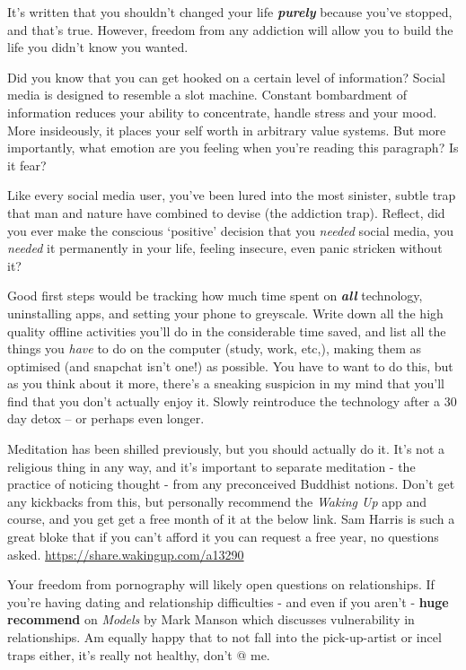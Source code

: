 \documentclass[
]{book}
\begin{document}
It's written that you shouldn't changed your life \textbf{\emph{purely}} because you've stopped, and that's true. However, freedom from any addiction will allow you to build the life you didn't know you wanted.

Did you know that you can get hooked on a certain level of information? Social media is designed to resemble a slot machine. Constant bombardment of information reduces your ability to concentrate, handle stress and your mood. More insideously, it places your self worth in arbitrary value systems. But more importantly, what emotion are you feeling when you're reading this paragraph? Is it fear?

Like every social media user, you've been lured into the most sinister, subtle trap that man and nature have combined to devise (the addiction trap). Reflect, did you ever make the conscious `positive' decision that you \emph{needed} social media, you \emph{needed} it permanently in your life, feeling insecure, even panic stricken without it?

Good first steps would be tracking how much time spent on \textbf{\emph{all}} technology, uninstalling apps, and setting your phone to greyscale. Write down all the high quality offline activities you'll do in the considerable time saved, and list all the things you \emph{have} to do on the computer (study, work, etc,), making them as optimised (and snapchat isn't one!) as possible. You have to want to do this, but as you think about it more, there's a sneaking suspicion in my mind that you'll find that you don't actually enjoy it. Slowly reintroduce the technology after a 30 day detox -- or perhaps even longer.

Meditation has been shilled previously, but you should actually do it. It's not a religious thing in any way, and it's important to separate meditation - the practice of noticing thought - from any preconceived Buddhist notions.
Don't get any kickbacks from this, but personally recommend the \emph{Waking Up} app and course, and you get get a free month of it at the below link. Sam Harris is such a great bloke that if you can't afford it you can request a free year, no questions asked.
\url{https://share.wakingup.com/a13290}

Your freedom from pornography will likely open questions on relationships. If you're having dating and relationship difficulties - and even if you aren't - \textbf{huge recommend} on \emph{Models} by Mark Manson which discusses vulnerability in relationships. Am equally happy that to not fall into the pick-up-artist or incel traps either, it's really not healthy, don't @ me.
\end{document}
